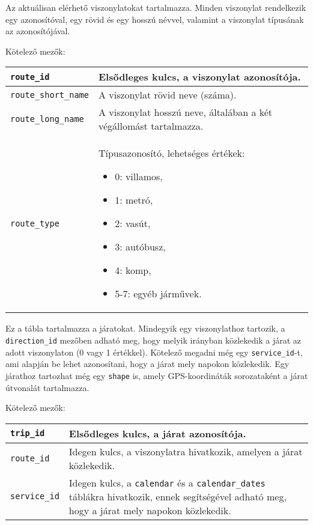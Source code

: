 
Az aktuálisan elérhető viszonylatokat tartalmazza. Minden viszonylat rendelkezik egy azonosítóval, egy rövid és egy hosszú névvel, valamint a viszonylat típusának az azonosítójával.

\medskip

\noindent Kötelező mezők:

\bigskip

\begin{tabular}{|p{3.5cm}|p{10cm}|}
\hline
\texttt{route\_id} & Elsődleges kulcs, a viszonylat azonosítója. \\
\hline
\texttt{route\_short\_name} & A viszonylat rövid neve (száma). \\
\hline
\texttt{route\_long\_name} & A viszonylat hosszú neve, általában a két végállomást tartalmazza. \\
\hline
\texttt{route\_type} & Típusazonosító, lehetséges értékek:
\begin{itemize}
\item 0: villamos,
\item 1: metró,
\item 2: vasút,
\item 3: autóbusz,
\item 4: komp,
\item 5-7: egyéb járművek.
\end{itemize}
\\
\hline
\end{tabular}


Ez a tábla tartalmazza a járatokat. Mindegyik egy viszonylathoz tartozik, a \\ \texttt{direction\_id} mezőben adható meg, hogy melyik irányban közlekedik a járat az adott viszonylaton (0 vagy 1 értékkel). Kötelező megadni még egy \texttt{service\_id}-t, ami alapján be lehet azonosítani, hogy a járat mely napokon közlekedik. Egy járathoz tartozhat még egy \texttt{shape} is, amely GPS-koordináták sorozataként a járat útvonalát tartalmazza.

\medskip

\noindent Kötelező mezők:

\bigskip

\begin{tabular}{|p{3cm}|p{10cm}|}
\hline
\texttt{trip\_id} & Elsődleges kulcs, a járat azonosítója. \\
\hline
\texttt{route\_id} & Idegen kulcs, a viszonylatra hivatkozik, amelyen a járat közlekedik. \\
\hline
\texttt{service\_id} & Idegen kulcs, a \texttt{calendar} és a \texttt{calendar\_dates} táblákra hivatkozik, ennek segítségével adható meg, hogy a járat mely napokon közlekedik. \\
\hline
\end{tabular}

